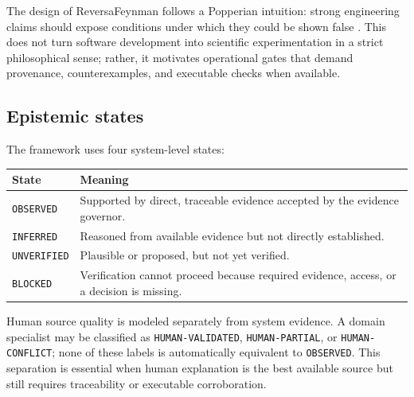 The design of ReversaFeynman follows a Popperian intuition: strong engineering claims should expose conditions under which they could be shown false \cite{popper1959logic}. This does not turn software development into scientific experimentation in a strict philosophical sense; rather, it motivates operational gates that demand provenance, counterexamples, and executable checks when available.

\subsection{Epistemic states}

The framework uses four system-level states:

\begin{center}
\begin{tabular}{p{3.0cm}p{10.5cm}}
\toprule
\textbf{State} & \textbf{Meaning} \\
\midrule
\texttt{OBSERVED} & Supported by direct, traceable evidence accepted by the evidence governor. \\
\texttt{INFERRED} & Reasoned from available evidence but not directly established. \\
\texttt{UNVERIFIED} & Plausible or proposed, but not yet verified. \\
\texttt{BLOCKED} & Verification cannot proceed because required evidence, access, or a decision is missing. \\
\bottomrule
\end{tabular}
\end{center}

Human source quality is modeled separately from system evidence. A domain specialist may be classified as \texttt{HUMAN-VALIDATED}, \texttt{HUMAN-PARTIAL}, or \texttt{HUMAN-CONFLICT}; none of these labels is automatically equivalent to \texttt{OBSERVED}. This separation is essential when human explanation is the best available source but still requires traceability or executable corroboration.